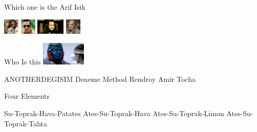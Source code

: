 \documentclass{exam}
\begin{document}
\begin{questions}
\question Which one is the Arif Isik\newline
\begin{oneparchoices}
\choice \includegraphics[height=2em]{faruk.jpg}
\choice \includegraphics[height=2em]{arifisik.jpg}
\choice \includegraphics[height=2em]{komutanlogar.jpeg}
\choice \includegraphics[height=2em]{216.jpg}
\end{oneparchoices}
\question Who Is this\newline
\includegraphics[height=3em]{rendroy2.jpg} \newline
\begin{oneparchoices}
\choice ANOTHERDEGISIM
\choice Deneme Method
\choice Rendroy
\choice Amir Tocha
\end{oneparchoices}
\question Four Elements\newline
\begin{oneparchoices}
\choice Su-Toprak-Hava-Patates
\choice Ates-Su-Toprak-Hava
\choice Ates-Su-Toprak-Limon
\choice Ates-Su-Toprak-Tahta
\end{oneparchoices}
\end{questions}
\end{document}
